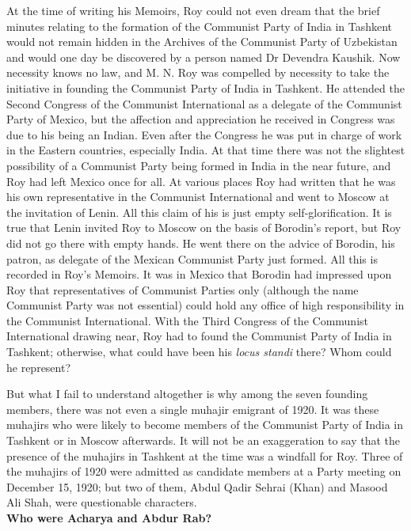 At the time of writing his Memoirs, Roy could not even dream that the brief minutes relating to the formation of 
the Communist Party of India in Tashkent would not remain hidden in the Archives of the Communist Party of Uzbekistan and would one day be discovered by a person named Dr Devendra Kaushik. Now necessity knows no law, and M. N. Roy was compelled by necessity to take the initiative in founding the Communist Party of India in Tashkent. He attended the Second Congress of the Communist International as a delegate of the Communist Party of Mexico, but the affection and appreciation he received in Congress was due to his being an Indian. Even after the Congress he was put in charge of work in the Eastern countries, especially India. At that time there was not the slightest possibility of a 
Communist Party being formed in India in the near future, and Roy had left Mexico once for all. At various places Roy had written that he was his own representative in the Communist International and went to Moscow at the invitation of Lenin. All this claim of his is just empty self-glorification. It is true that Lenin invited Roy to Moscow on the basis of Borodin’s report, but Roy did not go there with empty hands. He went there on the advice of Borodin, his patron, as delegate of the Mexican Communist Party just formed. All this is recorded in Roy’s Memoirs. It was in Mexico that Borodin had impressed upon Roy that representatives of Communist Parties only (although the name Communist Party was not essential) could hold any office of high responsibility in the Communist International. With the Third Congress of the Communist International drawing near, Roy had to found the Communist Party of India in Tashkent; otherwise, what could have been his \textit{locus standi} there? Whom could he represent?

But what I fail to understand altogether is why among the seven founding members, there was not even a single muhajir emigrant of 1920. It was these muhajirs who were likely to become members of the Communist Party of India in Tashkent or in Moscow afterwards. It will not be an exaggeration to say that the presence of the muhajirs in Tashkent at the time was a windfall for Roy. Three of the muhajirs of 1920 were 
admitted as candidate members at a Party meeting on December 15, 1920; but two of them, Abdul Qadir Sehrai (Khan) and Masood Ali Shah, were questionable characters.\\

\textbf{Who were Acharya and Abdur Rab?}\\

